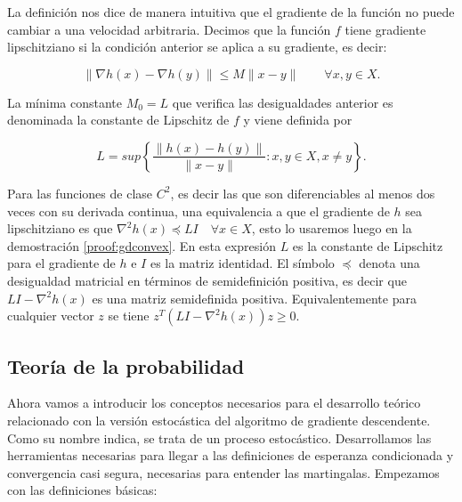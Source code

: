 La definición nos dice de manera intuitiva que el gradiente de la función no puede cambiar a una velocidad arbitraria. Decimos que la función $f$ tiene gradiente lipschitziano si la condición anterior se aplica a su gradiente, es decir:

$$\| \nabla h(x) - \nabla h(y) \| \leq M \| x - y \| \qquad \forall x,y \in X .$$


La mínima constante $M_0=L$ que verifica las desigualdades anterior es denominada la constante de Lipschitz de $f$ y viene definida por 

$$L=sup \left \{ \frac{\|h(x)-h(y)\|}{\|x - y \|} : x,y \in X, x \neq y \right \}.$$



Para las funciones de clase $C^2$, es decir las que son diferenciables al menos dos veces con su derivada continua, una equivalencia a que el gradiente de $h$ sea lipschitziano es que $\nabla^2 h(x) \preceq LI \quad \forall x \in X$, esto lo usaremos luego en la demostración \ref{proof:gdconvex}. En esta expresión $L$ es la constante de Lipschitz para el gradiente de $h$ e $I$ es la matriz identidad. El símbolo $\preceq$ denota una desigualdad matricial en términos de semidefinición positiva, es decir que $LI - \nabla^2h(x)$ es una matriz semidefinida positiva. Equivalentemente para cualquier vector $z$ se tiene $z^T \left ( LI - \nabla^2h(x) \right )z \geq 0$. 

\subsection{Teoría de la probabilidad}

Ahora vamos a introducir los conceptos necesarios para el desarrollo teórico relacionado con la versión estocástica del algoritmo de gradiente descendente. Como su nombre indica, se trata de un proceso estocástico. Desarrollamos las herramientas necesarias para llegar a las definiciones de esperanza condicionada y convergencia casi segura, necesarias para entender las martingalas. Empezamos con las definiciones básicas:

